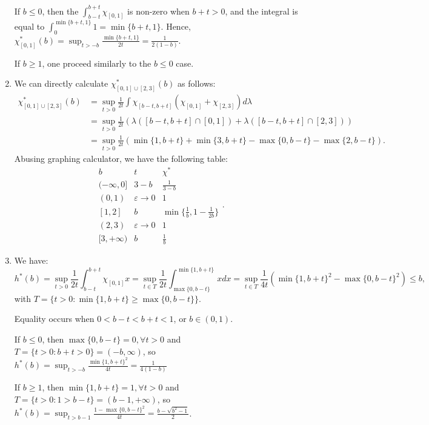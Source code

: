 \begin{enumerate}[label=\textbf{4A.\arabic*}]
    If \( b \le  0 \), then the \( \int _{b-t}^{b+t}\chi_{[0, 1]} \) is non-zero
    when \( b + t > 0 \), and the integral is equal to \( \int _{0}^{\min \{b+t,
    1\}  } 1 = \min \{b+t, 1\}   \). Hence, \( \chi_{[0, 1]}^{*}(b) = \sup _{t >
    -b} \frac{\min \{b+t, 1\}  }{2t} = \frac{1}{2(1-b)} \).

    If \( b \ge  1 \), one proceed similarly to the \( b \le 0 \) case.
  \item 
    We can directly calculate \( \chi_{[0,1] \cup [2, 3]}^{*}(b) \) as follows:
    \begin{align*}
      \chi_{[0,1]\cup [2,3]}^{*}(b) &= \sup _{t > 0} \frac{1}{2t} \int
      \chi_{[b-t, b+t]}(\chi_{[0,1]} + \chi_{[2,3]}) d\lambda\\
      &= \sup _{t>0} \frac{1}{2t} (\lambda([b-t,b+t]\cap [0,1]) +
      \lambda([b-t,b+t] \cap [2,3])) \\
      &= \sup _{t > 0} \frac{1}{2t} \left( \min \{1, b+t\} + \min \{3, b+t\} -
      \max \{0, b-t\} - \max\{2, b-t\}    \right) 
    .\end{align*}
    Abusing graphing calculator, we have the following table:
    \[
      \begin{array}{c|c|c}
        b & t & \chi^{*}\\
        \hline
        (-\infty, 0] & 3 - b & \frac{1}{3-b}\\
        \hline
        (0, 1) & \varepsilon \to 0 & 1\\
        \hline
        [1, 2] & b & \min \{\frac{1}{b}, 1 - \frac{1}{2b}\}\\
        \hline
        (2, 3) & \varepsilon \to 0 & 1\\
        \hline
        [3, +\infty) & b & \frac{1}{b}
      \end{array}
    .\]
  \item We have:
    \[
      h^{*}(b)= \sup _{t > 0} \frac{1}{2t} \int _{b-t}^{b+t} \chi_{[0,1]}x =
      \sup _{t \in T} \frac{1}{2t} \int _{\max \{0, b-t\}  }^{\min \{1, b+t\}  } xdx =
      \sup _{t \in T} \frac{1}{4t}\left( \min \{1, b + t\} ^2 - \max \{0, b - t\}
      ^2   \right) \le b
    ,\] with \( T = \{t > 0: \min \{1, b + t\} \ge \max \{0, b - t\}   \}   \).

    Equality occurs when \( 0 < b - t < b + t < 1 \), or \( b \in (0, 1) \).

    If \( b \le  0 \), then \( \max \{0, b-t\} = 0, \forall t > 0  \) and \( T =
    \{t > 0: b + t > 0\} = (-b, \infty)     \), so \(
    h^{*}(b) = \sup _{t > -b} \frac{\min \{1, b+t\} ^2 }{4t} = \frac{1}{4(1-b)} \)

    If \( b \ge  1 \), then \( \min \{1, b + t\} = 1, \forall t > 0     \) and \( T
    = \{t > 0: 1 > b - t\} = (b-1, +\infty)    \), so \( h^{*}(b) = \sup _{t >
    b-1} \frac{1 - \max \{0, b-t\}^2  }{4t} = \frac{b - \sqrt{b^2-1} }{2} \).

\end{enumerate}

